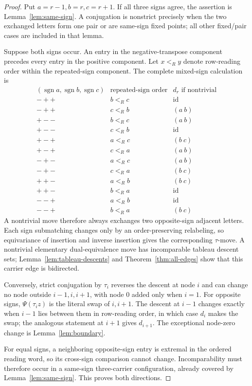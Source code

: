 \documentclass[10pt,a4paper]{amsart}
\newcommand{\sgn}{\operatorname{sgn}}
\begin{document}
\begin{proof}
Put $a=r-1,b=r,c=r+1$.  If all three signs agree, the assertion is
Lemma~\ref{lem:same-sign}.  A conjugation is nonstrict precisely when the
two exchanged letters form one pair or are same-sign fixed points; all
other fixed/pair cases are included in that lemma.

Suppose both signs occur.  An entry in the negative-transpose component
precedes every entry in the positive component.  Let $x<_{R}y$ denote
row-reading order within the repeated-sign component.  The complete
mixed-sign calculation is
\[
\begin{array}{c|c|c}
 (\sgn a,\sgn b,\sgn c)&\text{repeated-sign order}&
                           d_r\text{ if nontrivial}\\ \hline
 -++&b<_{R}c&\mathrm{id}\\
 -++&c<_{R}b&(a\ b)\\
 +--&b<_{R}c&(a\ b)\\
 +--&c<_{R}b&\mathrm{id}\\
 +-+&a<_{R}c&(b\ c)\\
 +-+&c<_{R}a&(a\ b)\\
 -+-&a<_{R}c&(a\ b)\\
 -+-&c<_{R}a&(b\ c)\\
 ++-&a<_{R}b&(b\ c)\\
 ++-&b<_{R}a&\mathrm{id}\\
 --+&a<_{R}b&\mathrm{id}\\
 --+&b<_{R}a&(b\ c)
\end{array}
\]
A nontrivial move therefore always exchanges two opposite-sign adjacent
letters.  Each sign submatching changes only by an order-preserving
relabeling, so equivariance of insertion and inverse insertion gives the
corresponding $\tau$-move.  A nontrivial elementary dual-equivalence move
has incomparable tableau descent sets; Lemma~\ref{lem:tableau-descents}
and Theorem~\ref{thm:all-edges} show that this carrier edge is bidirected.

Conversely, strict conjugation by $\tau_i$ reverses the descent at node
$i$ and can change no node outside $i-1,i,i+1$, with node $0$ added only
when $i=1$.  For opposite signs, $\Psi(\tau_i z)$ is the literal swap of
$i,i+1$.  The descent at $i-1$ changes exactly when $i-1$ lies between
them in row-reading order, in which case $d_i$ makes the swap; the
analogous statement at $i+1$ gives $d_{i+1}$.  The exceptional node-zero
change is Lemma~\ref{lem:boundary}.

For equal signs, a neighboring opposite-sign entry is extremal in the
ordered reading word, so its cross-sign comparison cannot change.
Incomparability must therefore occur in a same-sign three-carrier
configuration, already covered by Lemma~\ref{lem:same-sign}.  This proves
both directions.
\end{proof}
\end{document}
